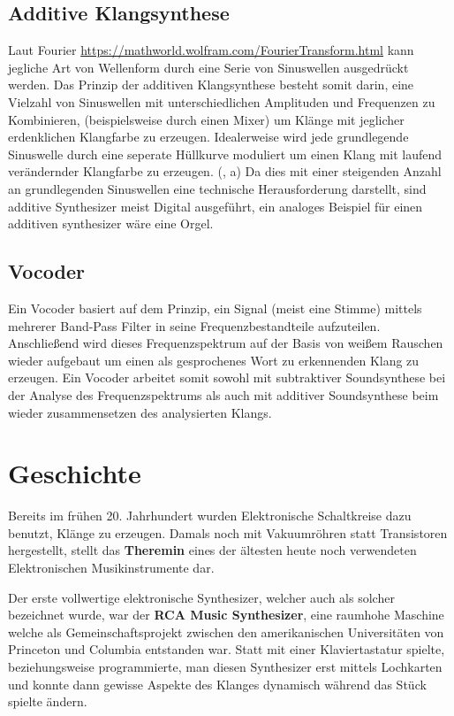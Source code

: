\subsection{Additive Klangsynthese}
\label{sec:orgc1d825a}
Laut Fourier \url{https://mathworld.wolfram.com/FourierTransform.html} kann jegliche Art von Wellenform durch eine Serie von Sinuswellen ausgedrückt werden. Das Prinzip der additiven Klangsynthese besteht somit darin, eine Vielzahl von Sinuswellen mit unterschiedlichen Amplituden und Frequenzen zu Kombinieren, (beispielsweise durch einen Mixer) um Klänge mit jeglicher erdenklichen Klangfarbe zu erzeugen. Idealerweise wird jede grundlegende Sinuswelle durch eine seperate Hüllkurve moduliert um einen Klang mit laufend verändernder Klangfarbe zu erzeugen. (, a) Da dies mit einer steigenden Anzahl an grundlegenden Sinuswellen eine technische Herausforderung darstellt, sind additive Synthesizer meist Digital ausgeführt, ein analoges Beispiel für einen additiven synthesizer wäre eine Orgel.

\subsection{Vocoder}
\label{sec:orgc5f8197}
Ein Vocoder basiert auf dem Prinzip, ein Signal (meist eine Stimme) mittels mehrerer Band-Pass Filter in seine Frequenzbestandteile aufzuteilen. Anschließend wird dieses Frequenzspektrum auf der Basis von weißem Rauschen wieder aufgebaut um einen als gesprochenes Wort zu erkennenden Klang zu erzeugen. Ein Vocoder arbeitet somit sowohl mit subtraktiver Soundsynthese bei der Analyse des Frequenzspektrums als auch mit additiver Soundsynthese beim wieder zusammensetzen des analysierten Klangs.

\section{Geschichte}
\label{sec:orgbcf88f9}
Bereits im frühen 20. Jahrhundert wurden Elektronische Schaltkreise dazu benutzt, Klänge zu erzeugen. Damals noch mit Vakuumröhren statt Transistoren hergestellt, stellt das \textbf{Theremin} eines der ältesten heute noch verwendeten Elektronischen Musikinstrumente dar.

Der erste vollwertige elektronische Synthesizer, welcher auch als solcher bezeichnet wurde, war der \textbf{RCA Music Synthesizer}, eine raumhohe Maschine welche als Gemeinschaftsprojekt zwischen den amerikanischen Universitäten von Princeton und Columbia entstanden war. Statt mit einer Klaviertastatur spielte, beziehungsweise programmierte, man diesen Synthesizer erst mittels Lochkarten und konnte dann gewisse Aspekte des Klanges dynamisch während das Stück spielte ändern.

